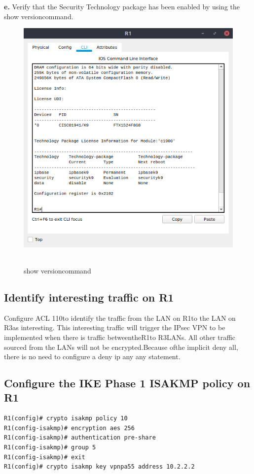 \documentclass[12pt]{extarticle}
\begin{document}
\textbf{e.} Verify that the Security Technology package has been enabled by using the show versioncommand.
\begin{center}
\begin{figure}[H]
\includegraphics[scale=0.7]{resources/q02e.png}\
\caption{show versioncommand}
\end{figure}
\end{center}

\subsection{Identify interesting traffic on R1}
Configure ACL 110to identify the traffic from the LAN on R1to the LAN on R3as interesting. This interesting traffic will trigger the IPsec VPN to be implemented when there is traffic betweentheR1to R3LANs. All other traffic sourced from the LANs will not be encrypted.Because ofthe implicit deny all, there is no need to configure a deny ip any any statement.

\subsection{Configure the IKE Phase 1 ISAKMP policy on R1}
\begin{verbatim}
R1(config)# crypto isakmp policy 10
R1(config-isakmp)# encryption aes 256
R1(config-isakmp)# authentication pre-share
R1(config-isakmp)# group 5
R1(config-isakmp)# exit
R1(config)# crypto isakmp key vpnpa55 address 10.2.2.2
\end{verbatim}
\end{document}
